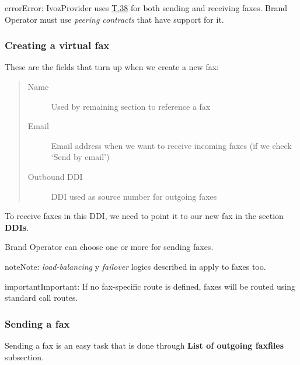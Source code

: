 \documentclass[letterpaper,10pt,english]{sphinxmanual}
\begin{document}
\begin{notice}{error}{Error:}
IvozProvider uses
\href{http://www.voip-info.org/wiki/view/T.38}{T.38} for both sending and receiving
faxes. Brand Operator must use \emph{peering contracts} that have support for it.
\end{notice}


\subsubsection{Creating a virtual fax}
\label{administration_portal/client/residential/faxes:creating-a-virtual-fax}
These are the fields that turn up when we create a new fax:
\begin{quote}
\begin{description}
\item[{Name}] \leavevmode
Used by remaining section to reference a fax

\item[{Email}] \leavevmode
Email address when we want to receive incoming faxes (if we check `Send
by email')

\item[{Outbound DDI}] \leavevmode
DDI used as source number for outgoing faxes

\end{description}
\end{quote}

To receive faxes in this DDI, we need to point it to our new fax in the section
\textbf{DDIs}.

Brand Operator can choose one or more {\hyperref[administration_portal/brand/routing/outgoing_routings:outgoing\string-routings]{}} for sending faxes.

\begin{notice}{note}{Note:}
\emph{load-balancing} y \emph{failover} logics described in {\hyperref[administration_portal/brand/routing/outgoing_routings:outgoing\string-routings]{}}
apply to faxes too.
\end{notice}

\begin{notice}{important}{Important:}
If no fax-specific route is defined, faxes will be routed using
standard call routes.
\end{notice}


\subsubsection{Sending a fax}
\label{administration_portal/client/residential/faxes:sending-a-fax}
Sending a fax is an easy task that is done through \textbf{List of outgoing faxfiles} subsection.
\end{document}

